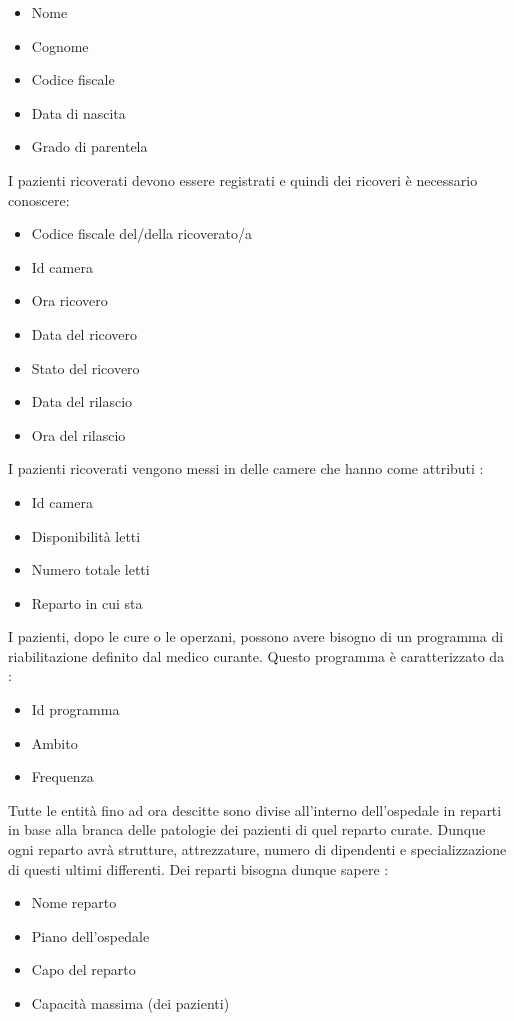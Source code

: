 \documentclass[a4paper, 10pt]{article}
\begin{document}
\begin{spacing}{0.8}
\begin{itemize}
    \item Nome
    \item Cognome
    \item Codice fiscale
    \item Data di nascita
    \item Grado di parentela
\end{itemize}
I pazienti ricoverati devono essere registrati e quindi dei ricoveri è necessario conoscere: 
\begin{itemize}
    \item Codice fiscale del/della ricoverato/a
    \item Id camera
    \item Ora ricovero
    \item Data del ricovero
    \item Stato del ricovero
    \item Data del rilascio
    \item  Ora del rilascio
\end{itemize}
I pazienti ricoverati vengono messi in delle camere che hanno come attributi :
\begin{itemize}
    \item Id camera
    \item Disponibilità letti
    \item Numero totale letti
    \item Reparto in cui sta
\end{itemize}
I pazienti, dopo le cure o le operzani, possono avere bisogno di un programma di riabilitazione definito dal medico curante. Questo programma è caratterizzato da : 
\begin{itemize}
    \item Id programma
    \item Ambito
    \item Frequenza
\end{itemize}
Tutte le entità fino ad ora descitte sono divise all'interno dell'ospedale in reparti in base alla branca delle patologie dei pazienti di quel reparto curate. Dunque ogni reparto avrà strutture, attrezzature, numero di dipendenti e specializzazione di questi ultimi differenti. Dei reparti bisogna dunque sapere :
\begin{itemize}
    \item Nome reparto
    \item Piano dell'ospedale
    \item Capo del reparto
    \item Capacità massima (dei pazienti)

\end{itemize}
\end{spacing}
\end{document}
